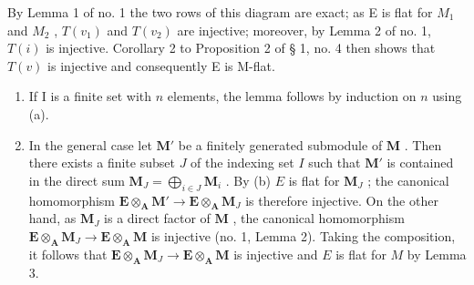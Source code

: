 By Lemma 1 of no. 1 the two rows of this diagram are exact; as E is flat for \(M_{1}\) and \(M_{2}\) , \(T(v_{1})\) and \(T(v_{2})\) are injective; moreover, by Lemma 2 of no. 1, \(T(i)\) is injective. Corollary 2 to Proposition 2 of § 1, no. 4 then shows that \(T(v)\) is injective and consequently E is M-flat.

\begin{enumerate}
\def\labelenumi{(\alph{enumi})}
\setcounter{enumi}{1}
\item
  If I is a finite set with \(n\) elements, the lemma follows by induction on \(n\) using (a).
\item
  In the general case let \(\mathbf{M}'\) be a finitely generated submodule of \(\mathbf{M}\) . Then there exists a finite subset \(J\) of the indexing set \(I\) such that \(\mathbf{M}'\) is contained in the direct sum \(\mathbf{M}_J = \bigoplus_{i \in J} \mathbf{M}_i\) . By (b) \(E\) is flat for \(\mathbf{M}_J\) ; the canonical homomorphism \(\mathbf{E} \otimes_{\mathbf{A}} \mathbf{M}' \to \mathbf{E} \otimes_{\mathbf{A}} \mathbf{M}_J\) is therefore injective. On the other hand, as \(\mathbf{M}_J\) is a direct factor of \(\mathbf{M}\) , the canonical homomorphism \(\mathbf{E} \otimes_{\mathbf{A}} \mathbf{M}_J \to \mathbf{E} \otimes_{\mathbf{A}} \mathbf{M}\) is injective (no. 1, Lemma 2). Taking the composition, it follows that \(\mathbf{E} \otimes_{\mathbf{A}} \mathbf{M}_J \to \mathbf{E} \otimes_{\mathbf{A}} \mathbf{M}\) is injective and \(E\) is flat for \(M\) by Lemma 3.
\end{enumerate}

